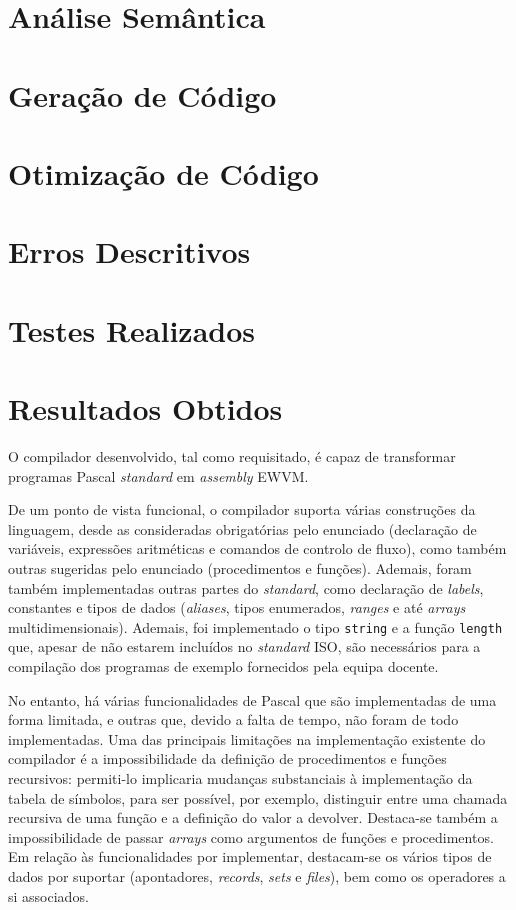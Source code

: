 \documentclass[12pt, a4paper]{article}
\begin{document}
\section{Análise Semântica}

\section{Geração de Código}

\section{Otimização de Código}

\section{Erros Descritivos}

\section{Testes Realizados}

\section{Resultados Obtidos}

O compilador desenvolvido, tal como requisitado, é capaz de transformar programas Pascal
\emph{standard} em \emph{assembly} EWVM.

De um ponto de vista funcional, o compilador suporta várias construções da linguagem, desde as
consideradas obrigatórias pelo enunciado (declaração de variáveis, expressões aritméticas e comandos
de controlo de fluxo), como também outras sugeridas pelo enunciado (procedimentos e funções).
Ademais, foram também implementadas outras partes do \emph{standard}, como declaração de
\emph{labels}, constantes e tipos de dados (\emph{aliases}, tipos enumerados, \emph{ranges} e até
\emph{arrays} multidimensionais). Ademais, foi implementado o tipo \texttt{string} e a função
\texttt{length} que, apesar de não estarem incluídos no \emph{standard} ISO, são necessários para a
compilação dos programas de exemplo fornecidos pela equipa docente.

No entanto, há várias funcionalidades de Pascal que são implementadas de uma forma limitada, e
outras que, devido a falta de tempo, não foram de todo implementadas. Uma das principais limitações
na implementação existente do compilador é a impossibilidade da definição de procedimentos e funções
recursivos: permiti-lo implicaria mudanças substanciais à implementação da tabela de símbolos, para
ser possível, por exemplo, distinguir entre uma chamada recursiva de uma função e a definição do
valor a devolver. Destaca-se também a impossibilidade de passar \emph{arrays} como argumentos de
funções e procedimentos. Em relação às funcionalidades por implementar, destacam-se os vários tipos
de dados por suportar (apontadores, \emph{records}, \emph{sets} e \emph{files}), bem como os
operadores a si associados.
\end{document}
